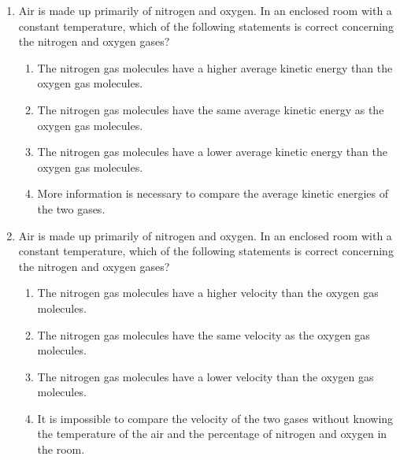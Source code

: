\documentclass{../../oss-apphys}
\begin{document}
\begin{multicols}{2}
\begin{enumerate}[leftmargin=18pt,start=3]
  \item Air is made up primarily of nitrogen and oxygen. In an enclosed room
    with a constant temperature, which of the following statements is
    correct concerning the nitrogen and oxygen gases?
    \begin{enumerate}[noitemsep,topsep=0pt,leftmargin=18pt,label=(\Alph*)]
    \item The nitrogen gas molecules have a higher average kinetic energy than
      the oxygen gas molecules.
    \item The nitrogen gas molecules have the same average kinetic energy as
      the oxygen gas molecules.
    \item The nitrogen gas molecules have a lower average kinetic energy than
      the oxygen gas molecules.
    \item More information is necessary to compare the average kinetic energies
      of the two gases.
    \end{enumerate}
    
  \item Air is made up primarily of nitrogen and oxygen. In an enclosed room
    with a constant temperature, which of the following statements is correct
    concerning the nitrogen and oxygen gases?
    \begin{enumerate}[noitemsep,topsep=0pt,leftmargin=18pt,label=(\Alph*)]
    \item The nitrogen gas molecules have a higher velocity than the oxygen gas
      molecules.
    \item The nitrogen gas molecules have the same velocity as the oxygen gas
      molecules.
    \item The nitrogen gas molecules have a lower velocity than the oxygen gas
      molecules.
    \item It is impossible to compare the velocity of the two gases without
      knowing the temperature of the air and the percentage of nitrogen and
      oxygen in the room.
    \end{enumerate}

    \columnbreak
    

\end{enumerate}
\end{multicols}
\end{document}
